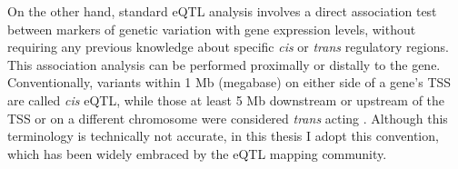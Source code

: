On the other hand, standard eQTL analysis involves a direct association test between markers of genetic variation with gene expression levels, without requiring any previous knowledge about specific \textit{cis} or \textit{trans} regulatory regions. 
This association analysis can be performed proximally or distally to the gene. 
Conventionally, 
variants within 1 Mb (megabase) on either side of a gene's TSS are called \textit{cis} eQTL, while those at least 5 Mb downstream or upstream of the TSS or on a different chromosome were considered \textit{trans} acting \cite{nica2013expression, westra2014genome}.
Although this terminology is technically not accurate, in this thesis I adopt this convention, which has been widely embraced by the eQTL mapping community. 




